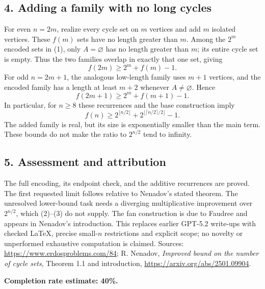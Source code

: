 \subsection*{4. Adding a family with no long cycles}
For even $n=2m$, realize every cycle set on $m$ vertices and add $m$ isolated vertices. These $f(m)$ sets have no length greater than $m$. Among the $2^m$ encoded sets in (1), only $A=\varnothing$ has no length greater than $m$; its entire cycle set is empty. Thus the two families overlap in exactly that one set, giving
\[
 f(2m)\ge2^m+f(m)-1. \tag{2}
\]
For odd $n=2m+1$, the analogous low-length family uses $m+1$ vertices, and the encoded family has a length at least $m+2$ whenever $A\ne\varnothing$. Hence
\[
 f(2m+1)\ge2^m+f(m+1)-1. \tag{3}
\]
In particular, for $n\ge8$ these recurrences and the base construction imply
\[
 f(n)\ge2^{\lfloor n/2\rfloor}
 +2^{\lfloor\lceil n/2\rceil/2\rfloor}-1.
\]
The added family is real, but its size is exponentially smaller than the main term. These bounds do not make the ratio to $2^{n/2}$ tend to infinity.

\subsection*{5. Assessment and attribution}
The full encoding, its endpoint check, and the additive recurrences are proved. The first requested limit follows relative to Nenadov's stated theorem. The unresolved lower-bound task needs a diverging multiplicative improvement over $2^{n/2}$, which (2)--(3) do not supply. The fan construction is due to Faudree and appears in Nenadov's introduction. This replaces earlier GPT-5.2 write-ups with checked LaTeX, precise small-$n$ restrictions and explicit scope; no novelty or unperformed exhaustive computation is claimed.
Sources: \url{https://www.erdosproblems.com/84}; R. Nenadov, \emph{Improved bound on the number of cycle sets}, Theorem 1.1 and introduction, \url{https://arxiv.org/abs/2501.09904}.

\textbf{Completion rate estimate: 40\%.}
